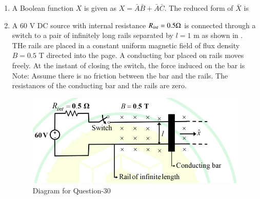 \documentclass[journal,12pt,onecolumn]{IEEEtran}
\theoremstyle{remark}
\begin{document}
\begin{enumerate}
\item A Boolean function $X$ is given as $X=\bar A\bar B+\bar A\bar C$. The reduced form of $\bar X$ is \par\hfill{}
\begin{enumerate}
\end{enumerate}


\item A $60$ V DC source with internal resistance $R_{int}=0.5\ohm$ is connected through a switch to a pair of infinitely long rails separated by $l=1$ m as shown in . THe rails are placed in a constant uniform magnetic field of flux density $B=0.5$ T  directed into the page. A conducting bar placed on rails moves freely. At the instant of closing the switch, the force induced on the bar is\\
Note: Assume there is no friction between the bar and the rails. The resistances of the conducting bar and the rails are zero. \par\hfill{}
\begin{figure}[H]
\centering
\includegraphics[width=0.5\columnwidth]{Figs/Q-30.jpg}
\caption{Diagram for Question-30}
\label{30}
\end{figure}
\begin{enumerate}
\end{enumerate}



\end{enumerate}
\end{document}

